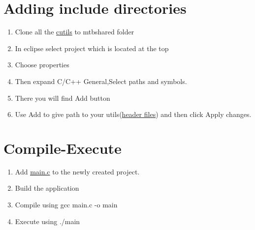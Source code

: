 \documentclass[journal,5pt,twocolumn]{IEEEtran}
\begin{document}
\vspace{10mm}
\section{\textbf{Adding include directories}}
\begin{enumerate}
\item Clone all the {\href{https://github.com/KrishnaYadati/MTB-Linkedlist-port/blob/main/c-utils}{cutils}} to mtbshared folder
\item In eclipse select project which is located at the top
\item Choose properties
\item Then expand C/C++ General,Select paths and symbols.
\item There you will find Add button
\item Use Add to give path to your utils({\href{https://github.com/KrishnaYadati/MTB-Linkedlist-port/blob/main/codes/linkedlist.h}{header files}}) and then click Apply changes.
\end{enumerate}
\section{\textbf{Compile-Execute}}
\begin{enumerate}
\item Add {\href{https://github.com/KrishnaYadati/MTB-Linkedlist-port/blob/main/codes/main.c}{main.c}} to the newly created project.
 \item Build the application
  \item Compile using gcc main.c -o main
  \item Execute using ./main
\end{enumerate}
\end{document}
